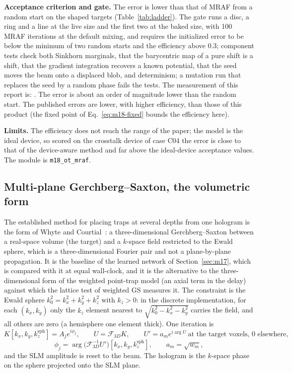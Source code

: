 \textbf{Acceptance criterion and gate.} The error is lower than that of MRAF from a random start on the shaped targets (Table~\ref{tab:ladder}). The gate runs a disc, a ring and a line at the live size and the first two at the baked size, with 100 MRAF iterations at the default mixing, and requires the initialized error to be below the minimum of two random starts and the efficiency above 0.3; component tests check both Sinkhorn marginals, that the barycentric map of a pure shift is a shift, that the gradient integration recovers a known potential, that the seed moves the beam onto a displaced blob, and determinism; a mutation run that replaces the seed by a random phase fails the tests. The measurement of this report is: . The error is about an order of magnitude lower than the random start. The published errors are lower, with higher efficiency, than those of this product (the fixed point of Eq.~\eqref{eq:m18-fixed} bounds the efficiency here).

\textbf{Limits.} The efficiency does not reach the range of the paper; the model is the ideal device, so scored on the crosstalk device of case C04 the error is close to that of the device-aware method and far above the ideal-device acceptance values. The module is \texttt{m18\_ot\_mraf}.

\subsection{Multi-plane Gerchberg--Saxton, the volumetric form}\label{sec:m19}

The established method for placing traps at several depths from one hologram is the form of Whyte and Courtial~\cite{whyte}: a three-dimensional Gerchberg--Saxton between a real-space volume (the target) and a $k$-space field restricted to the Ewald sphere, which is a three-dimensional Fourier pair and not a plane-by-plane propagation. It is the baseline of the learned network of Section~\ref{sec:m17}, which is compared with it at equal wall-clock, and it is the alternative to the three-dimensional form of the weighted point-trap model (an axial term in the delay) against which the lattice test of weighted GS measures it. The constraint is the Ewald sphere $k_0^2=k_x^2+k_y^2+k_z^2$ with $k_z>0$: in the discrete implementation, for each $(k_x,k_y)$ only the $k_z$ element nearest to $\sqrt{k_0^2-k_x^2-k_y^2}$ carries the field, and all others are zero (a hemisphere one element thick). One iteration is
\begin{equation}
K[k_x,k_y,k_z^{\mathrm{sph}}]=A_je^{i\phi_j},\qquad U=\mathcal F_{3D}K,\qquad
U'=a_me^{i\arg U}\ \text{at the target voxels, 0 elsewhere},
\label{eq:m19}
\end{equation}
\begin{equation}
\phi_j=\arg\big(\mathcal F_{3D}^{-1}U'\big)[k_x,k_y,k_z^{\mathrm{sph}}],\qquad a_m=\sqrt{w_m},
\label{eq:m19-back}
\end{equation}
and the SLM amplitude is reset to the beam. The hologram is the $k$-space phase on the sphere projected onto the SLM plane.

